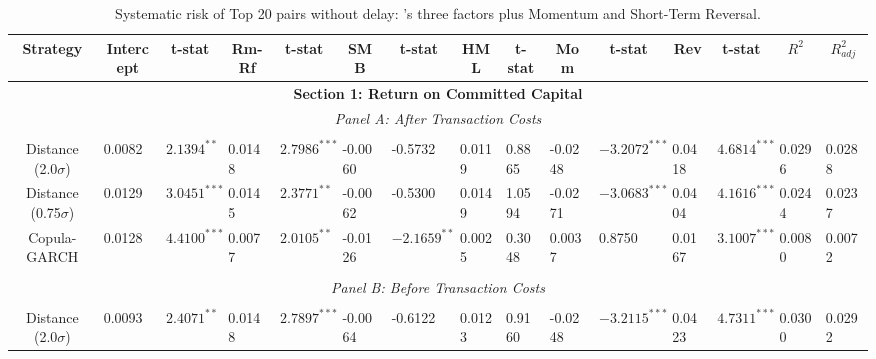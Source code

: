 \documentclass[a4paper]{article}
\begin{document}
	\begin{sidewaystable}
		\caption{Systematic risk of Top 20 pairs without delay: \citet*{ff93}'s three factors plus Momentum and Short-Term Reversal.}
		\begin{threeparttable}[H]
			\centering \scriptsize
			\begin{tabularx}{\textwidth}{@{\extracolsep{\fill}}lllllllllllllll@{}}
				\toprule
				\multicolumn{1}{c}{Strategy} & \multicolumn{1}{c}{Intercept} & \multicolumn{1}{c}{t-stat} & \multicolumn{1}{c}{Rm-Rf} & \multicolumn{1}{c}{t-stat} & \multicolumn{1}{c}{SMB} & \multicolumn{1}{c}{t-stat} & \multicolumn{1}{c}{HML} & \multicolumn{1}{c}{t-stat} & \multicolumn{1}{c}{Mom} & \multicolumn{1}{c}{t-stat} & \multicolumn{1}{c}{Rev} & \multicolumn{1}{c}{t-stat} & \multicolumn{1}{c}{$R^{2}$} & \multicolumn{1}{c}{$R^{2}_{adj}$} \\
				\midrule
				\multicolumn{15}{c}{\textbf{Section 1: Return on Committed Capital}} \\
				\multicolumn{15}{c}{\textit{Panel A: After Transaction Costs}} \\
				\multicolumn{1}{c}{} & \multicolumn{1}{c}{} & \multicolumn{1}{c}{} & \multicolumn{1}{c}{} & \multicolumn{1}{c}{} & \multicolumn{1}{c}{} & \multicolumn{1}{c}{} & \multicolumn{1}{c}{} &       &       &       &       &       &       &  \\
				\multicolumn{1}{c}{Distance (2.0$\sigma$)} & 0.0082 & $2.1394^{**}$ & 0.0148 & $2.7986^{***}$ & -0.0060 & -0.5732 & 0.0119 & 0.8865 & -0.0248 & $-3.2072^{***}$ & 0.0418 & $4.6814^{***}$ & 0.0296 & 0.0288\\
				\multicolumn{1}{c}{Distance (0.75$\sigma$)} & 0.0129 & $3.0451^{***}$ & 0.0145 & $2.3771^{**}$ & -0.0062 & -0.5300 & 0.0149 & 1.0594 & -0.0271 & $-3.0683^{***}$ & 0.0404 & $4.1616^{***}$ & 0.0244 & 0.0237 \\
				\multicolumn{1}{c}{Copula-GARCH} & 0.0128 & $4.4100^{***}$ & 0.0077 & $2.0105^{**}$ & -0.0126 & $-2.1659^{**}$ & 0.0025 & 0.3048 & 0.0037 & 0.8750 & 0.0167 & $3.1007^{***}$ & 0.0080 & 0.0072 \\
				&       &       &       &       &       &       &       &       &       &       &       &       &       &  \\
				\multicolumn{15}{c}{\textit{Panel B: Before Transaction Costs}} \\
				&       &       &       &       &       &       &       &       &       &       &       &       &       &  \\
				\multicolumn{1}{c}{Distance (2.0$\sigma$)} & 0.0093 & $2.4071^{**}$ & 0.0148 & $2.7897^{***}$ & -0.0064 & -0.6122 & 0.0123 & 0.9160 & -0.0248 & $-3.2115^{***}$ & 0.0423 & $4.7311^{***}$ & 0.0300 & 0.0292 \\

\end{tabularx}
\end{threeparttable}
\end{sidewaystable}
\end{document}
